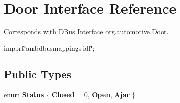 \hypertarget{interfaceDoor}{\section{Door Interface Reference}
\label{interfaceDoor}
}


Corresponds with D\+Bus Interface org.\+automotive.\+Door.  




{\ttfamily import\char`\"{}ambdbusmappings.\+idl\char`\"{};}

\subsection*{Public Types}
\begin{DoxyCompactItemize}
\item 
\hypertarget{interfaceDoor_a9f2145fe74af8c0c135e76f62e752973}{enum {\bfseries Status} \{ {\bfseries Closed} = 0, 
{\bfseries Open}, 
{\bfseries Ajar}
 \}}\label{interfaceDoor_a9f2145fe74af8c0c135e76f62e752973}

\end{DoxyCompactItemize}
